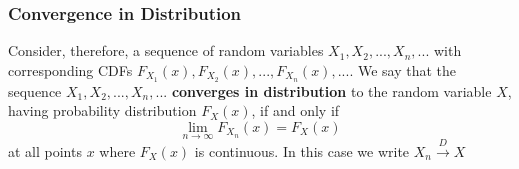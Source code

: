 \documentclass[notes=show,smaller,handout]{beamer}
\begin{document}
\begin{frame}%

\frametitle{Convergence in Distribution}

\begin{definition}
Consider, therefore, a sequence of random variables $X_{1},X_{2},...,X_{n},...$ with corresponding CDFs $F_{X_{1}}\left( x\right) ,F_{X_{2}}\left( x\right),...,F_{X_{n}}\left(x\right) ,...$. We say that the sequence $X_{1},X_{2},...,X_{n},...$ \textbf{converges in distribution} to the random variable $X$, having probability distribution $F_X(x)$, if and only if
\begin{equation*}
\lim_{n\rightarrow \infty }F_{X_n}\left( x\right) =F_{X}\left( x\right)
\end{equation*}
at all points $x$ where $F_{X}\left( x\right) $ is continuous. In this case we write $X_{n}\overset{D}{\rightarrow }X$
\end{definition}
\end{frame}%
\end{document}
